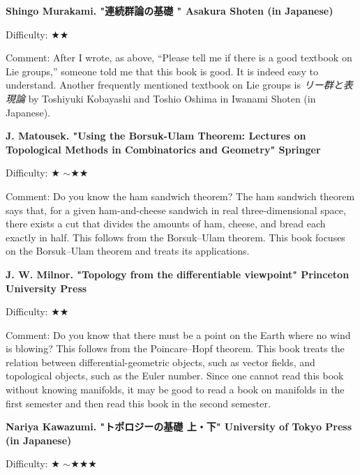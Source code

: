 \textbf{Shingo Murakami. "連続群論の基礎 " Asakura Shoten (in Japanese)}  　\vspace{-6pt} 

Difficulty: ★★ 　\vspace{-6pt} 

Comment: After I wrote, as above, ``Please tell me if there is a good textbook on Lie groups,'' someone told me that this book is good. It is indeed easy to understand. Another frequently mentioned textbook on Lie groups is \emph{リー群と表現論} by Toshiyuki Kobayashi and Toshio Oshima in Iwanami Shoten (in Japanese).
\vspace{8pt}

\textbf{J. Matousek. "Using the Borsuk-Ulam Theorem: Lectures on Topological Methods in Combinatorics and Geometry" Springer}  　\vspace{-6pt} 

Difficulty: ★ $\sim$★★\vspace{-6pt} 

Comment: Do you know the ham sandwich theorem? The ham sandwich theorem says that, for a given ham-and-cheese sandwich in real three-dimensional space, there exists a cut that divides the amounts of ham, cheese, and bread each exactly in half. This follows from the Borsuk--Ulam theorem. This book focuses on the Borsuk--Ulam theorem and treats its applications.

\vspace{8pt}

\textbf{J. W. Milnor. "Topology from the differentiable viewpoint" Princeton University Press}  　\vspace{-6pt} 

Difficulty: ★★ \vspace{-6pt} 

Comment: Do you know that there must be a point on the Earth where no wind is blowing? This follows from the Poincare--Hopf theorem. This book treats the relation between differential-geometric objects, such as vector fields, and topological objects, such as the Euler number. Since one cannot read this book without knowing manifolds, it may be good to read a book on manifolds in the first semester and then read this book in the second semester.
\vspace{8pt}

\textbf{Nariya Kawazumi. "トポロジーの基礎 上・下" University of Tokyo Press (in Japanese)}  　\vspace{-6pt} 

Difficulty: ★ $\sim$★★★\vspace{-6pt} 

